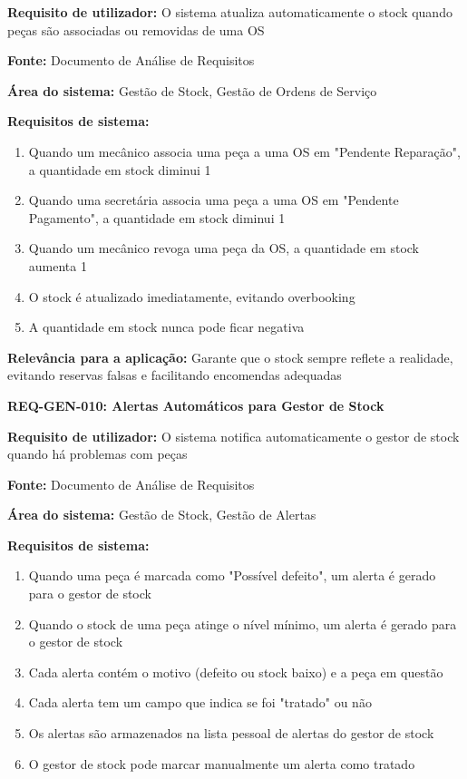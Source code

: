 \documentclass[11pt,a4paper]{article}
\newcommand{\reqheader}[1]{{\noindent\large\bfseries\color{sectionblue}#1}\par\vspace{0.3cm}}
\newcommand{\reqfield}[2]{{\noindent\textbf{#1:} #2}\par\vspace{0.2cm}}
\begin{document}
\reqfield{Requisito de utilizador}{O sistema atualiza automaticamente o stock quando peças são associadas ou removidas de uma OS}

\reqfield{Fonte}{Documento de Análise de Requisitos}

\reqfield{Área do sistema}{Gestão de Stock, Gestão de Ordens de Serviço}

\reqfield{Requisitos de sistema}{
	\begin{enumerate}
		\item Quando um mecânico associa uma peça a uma OS em "Pendente Reparação", a quantidade em stock diminui 1
		\item Quando uma secretária associa uma peça a uma OS em "Pendente Pagamento", a quantidade em stock diminui 1
		\item Quando um mecânico revoga uma peça da OS, a quantidade em stock aumenta 1
		\item O stock é atualizado imediatamente, evitando overbooking
		\item A quantidade em stock nunca pode ficar negativa
	\end{enumerate}
}

\reqfield{Relevância para a aplicação}{Garante que o stock sempre reflete a realidade, evitando reservas falsas e facilitando encomendas adequadas}

\vspace{0.8cm}

\reqheader{REQ-GEN-010: Alertas Automáticos para Gestor de Stock}

\reqfield{Requisito de utilizador}{O sistema notifica automaticamente o gestor de stock quando há problemas com peças}

\reqfield{Fonte}{Documento de Análise de Requisitos}

\reqfield{Área do sistema}{Gestão de Stock, Gestão de Alertas}

\reqfield{Requisitos de sistema}{
	\begin{enumerate}
		\item Quando uma peça é marcada como "Possível defeito", um alerta é gerado para o gestor de stock
		\item Quando o stock de uma peça atinge o nível mínimo, um alerta é gerado para o gestor de stock
		\item Cada alerta contém o motivo (defeito ou stock baixo) e a peça em questão
		\item Cada alerta tem um campo que indica se foi "tratado" ou não
		\item Os alertas são armazenados na lista pessoal de alertas do gestor de stock
		\item O gestor de stock pode marcar manualmente um alerta como tratado
	\end{enumerate}
}
\end{document}
